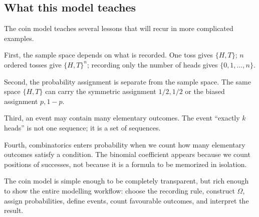 \subsection*{What this model teaches}

The coin model teaches several lessons that will recur in more complicated
examples.

First, the sample space depends on what is recorded. One toss gives
\(\{H,T\}\); \(n\) ordered tosses give \(\{H,T\}^n\); recording only the number of
heads gives \(\{0,1,\ldots,n\}\).

Second, the probability assignment is separate from the sample space. The same
space \(\{H,T\}\) can carry the symmetric assignment \(1/2,1/2\) or the biased
assignment \(p,1-p\).

Third, an event may contain many elementary outcomes. The event ``exactly
\(k\) heads'' is not one sequence; it is a set of sequences.

Fourth, combinatorics enters probability when we count how many elementary
outcomes satisfy a condition. The binomial coefficient appears because we count
positions of successes, not because it is a formula to be memorized in isolation.

\begin{remarkbox}
The coin model is simple enough to be completely transparent, but rich enough to
show the entire modelling workflow: choose the recording rule, construct
\(\Omega\), assign probabilities, define events, count favourable outcomes, and
interpret the result.
\end{remarkbox}
